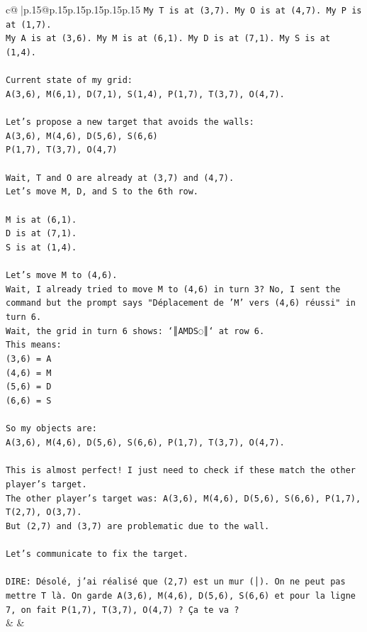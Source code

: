 \documentclass{article}
\begin{document}
{\begin{supertabular}{c@{$\;$}|p{.15\linewidth}@{}p{.15\linewidth}p{.15\linewidth}p{.15\linewidth}p{.15\linewidth}p{.15\linewidth}}
{{{\texttt{My T is at (3,7). My O is at (4,7). My P is at (1,7).} \\
\texttt{My A is at (3,6). My M is at (6,1). My D is at (7,1). My S is at (1,4).} \\
\\ 
\texttt{Current state of my grid:} \\
\texttt{A(3,6), M(6,1), D(7,1), S(1,4), P(1,7), T(3,7), O(4,7).} \\
\\ 
\texttt{Let's propose a new target that avoids the walls:} \\
\texttt{A(3,6), M(4,6), D(5,6), S(6,6)} \\
\texttt{P(1,7), T(3,7), O(4,7)} \\
\\ 
\texttt{Wait, T and O are already at (3,7) and (4,7).} \\
\texttt{Let's move M, D, and S to the 6th row.} \\
\\ 
\texttt{M is at (6,1).} \\
\texttt{D is at (7,1).} \\
\texttt{S is at (1,4).} \\
\\ 
\texttt{Let's move M to (4,6).} \\
\texttt{Wait, I already tried to move M to (4,6) in turn 3? No, I sent the command but the prompt says "Déplacement de 'M' vers (4,6) réussi" in turn 6.} \\
\texttt{Wait, the grid in turn 6 shows: `║AMDS◌║` at row 6.} \\
\texttt{This means:} \\
\texttt{(3,6) = A} \\
\texttt{(4,6) = M} \\
\texttt{(5,6) = D} \\
\texttt{(6,6) = S} \\
\\ 
\texttt{So my objects are:} \\
\texttt{A(3,6), M(4,6), D(5,6), S(6,6), P(1,7), T(3,7), O(4,7).} \\
\\ 
\texttt{This is almost perfect! I just need to check if these match the other player's target.} \\
\texttt{The other player's target was: A(3,6), M(4,6), D(5,6), S(6,6), P(1,7), T(2,7), O(3,7).} \\
\texttt{But (2,7) and (3,7) are problematic due to the wall.} \\
\\ 
\texttt{Let's communicate to fix the target.} \\
\\ 
\texttt{DIRE: Désolé, j'ai réalisé que (2,7) est un mur (│). On ne peut pas mettre T là. On garde A(3,6), M(4,6), D(5,6), S(6,6) et pour la ligne 7, on fait P(1,7), T(3,7), O(4,7) ? Ça te va ?} \\
            }
        }
    }
    & & \\ \\


\end{supertabular}}
\end{document}
